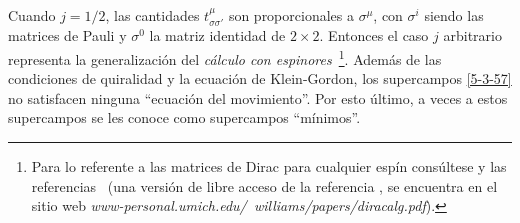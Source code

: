Cuando $ j=1/2 $, las cantidades $ t_{\sigma\sigma'}^{\mu} $ son proporcionales a $ \sigma^{\mu} $, con $ \sigma^{i} $ siendo las matrices de Pauli y  $ \sigma^{0} $ la matriz identidad de $ 2\times 2 $. Entonces el caso $ j $ arbitrario representa la generalización del 
 \emph{cálculo con espinores}~\footnote{Para lo referente a las matrices de Dirac para cualquier espín consúltese y las referencias~\cite{Weinberg:1964cn,PhysRev.130.442} (una versión de libre acceso de la referencia , se encuentra en  el sitio web  \textit{www-personal.umich.edu/~williams/papers/diracalg.pdf}).}. Además de las condiciones de quiralidad y la ecuación de Klein-Gordon, los supercampos \eqref{5-3-57} no satisfacen ninguna ``ecuación del movimiento''. Por esto último, a veces a estos supercampos se les conoce como supercampos ``mínimos''. \\



